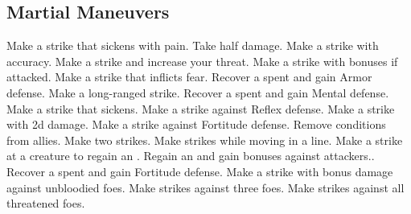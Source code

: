 \subsection{Martial Maneuvers}\label{Martial Maneuvers}
\begin{spelllist}
 Make a strike that sickens with pain.
 Take half damage.
 Make a strike with  accuracy.
 Make a strike and increase your threat.
 Make a strike with bonuses if attacked.
 Make a strike that inflicts fear.
 Recover a spent  and gain  Armor defense.
 Make a long-ranged strike.
 Recover a spent  and gain  Mental defense.
 Make a strike that sickens.
 Make a strike against Reflex defense.
 Make a strike with \plus2d damage.
 Make a strike against Fortitude defense.
 Remove conditions from allies.
 Make two strikes.
 Make strikes while moving in a line.
 Make a strike at a creature to regain an .
 Regain an  and gain bonuses against attackers..
 Recover a spent  and gain  Fortitude defense.
 Make a strike with bonus damage against unbloodied foes.
 Make strikes against three foes.
 Make strikes against all threatened foes.
\end{spelllist}



\small

